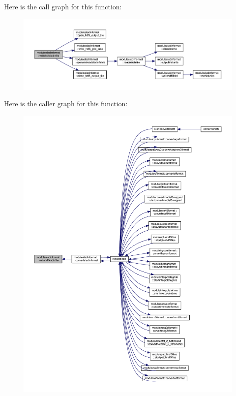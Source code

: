 Here is the call graph for this function\+:\nopagebreak
\begin{figure}[H]
\begin{center}
\leavevmode
\includegraphics[width=350pt]{namespacemodulealadinformat_ad234b4831ac8d0d1f8ad444d37000469_cgraph}
\end{center}
\end{figure}
Here is the caller graph for this function\+:\nopagebreak
\begin{figure}[H]
\begin{center}
\leavevmode
\includegraphics[width=350pt]{namespacemodulealadinformat_ad234b4831ac8d0d1f8ad444d37000469_icgraph}
\end{center}
\end{figure}
\mbox{\label{namespacemodulealadinformat_a2c5da57a26426886fbd2f4fbe4ce299c}} 
